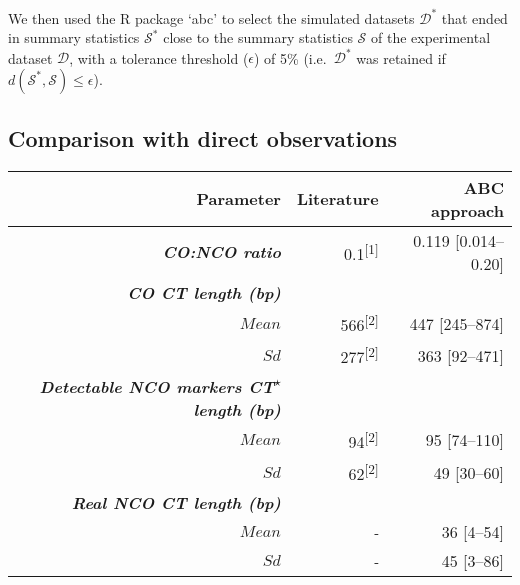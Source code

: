 We then used the R package ‘abc’ \citep{csillery2012abc} to select the simulated datasets $\mathcal{D^{*}}$ that ended in summary statistics $\mathcal{S^{*}}$ close to the summary statistics $\mathcal{S}$ of the experimental dataset $\mathcal{D}$, with a tolerance threshold ($\epsilon$) of 5\% (i.e.\ $\mathcal{D^{*}}$ was retained if $d(\mathcal{S^{*}}, \mathcal{S}) \leq \epsilon$). 





\subsection{Comparison with direct observations}


\begin{table}[b!]
	\centering
	\begin{adjustbox}{width = 1\textwidth}
		\begin{tabular}{rrr}

			\toprule
			\textbf{Parameter} & \textbf{Literature} & \textbf{ABC approach} \\

			\midrule
			\textbf{\textit{CO:NCO ratio}}      & 0.1\textsuperscript{[1]}  & 0.119 [0.014--0.20] \\
			\textbf{\textit{CO CT length (bp)}}\\
			$Mean$                              & 566\textsuperscript{[2]}  & 447 [245--874] \\
			$Sd$                                & 277\textsuperscript{[2]}  & 363 [92--471] \\
			\textbf{\textit{Detectable NCO markers CT\textsuperscript{$\star$} length (bp)}}\\
			$Mean$                              &  94\textsuperscript{[2]}  & 95 [74--110] \\
			$Sd$                                &  62\textsuperscript{[2]}  & 49 [30--60] \\

			\textbf{\textit{Real NCO CT length (bp)}}\\
			$Mean$                  &  \textit{-}  & 36 [4--54] \\
			$Sd$                    &  \textit{-}  & 45 [3--86] \\

			\bottomrule


\end{tabular}
\end{adjustbox}
\end{table}
